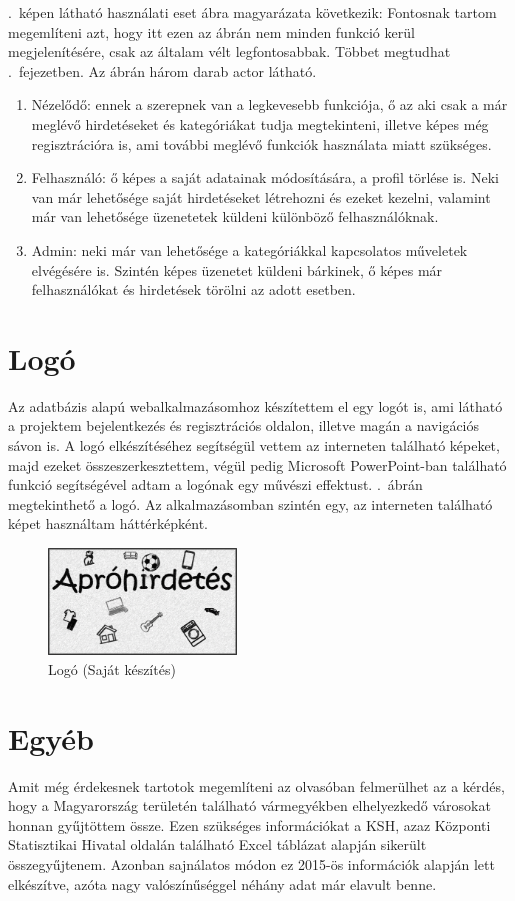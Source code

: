 \documentclass[]{thesis-ekf}
\theoremstyle{definition}
\theoremstyle{remark}
\begin{document}
	.~képen látható használati eset ábra magyarázata következik:
	Fontosnak tartom megemlíteni azt, hogy itt ezen az ábrán nem minden funkció kerül megjelenítésére, csak az általam vélt  legfontosabbak. Többet megtudhat .~fejezetben. Az ábrán három darab actor látható.
	\begin{enumerate}
		\item Nézelődő: ennek a szerepnek van a legkevesebb funkciója, ő az aki csak a már meglévő hirdetéseket és kategóriákat tudja megtekinteni, illetve képes még regisztrációra is, ami további meglévő funkciók használata miatt szükséges.
		\item Felhasználó: ő képes a saját adatainak módosítására, a profil törlése is. Neki van már lehetősége saját hirdetéseket létrehozni és ezeket kezelni, valamint már van lehetősége üzenetetek küldeni különböző felhasználóknak.
		\item Admin: neki már van lehetősége a kategóriákkal kapcsolatos műveletek elvégésére is. Szintén képes üzenetet küldeni bárkinek, ő képes már felhasználókat és hirdetések törölni az adott esetben.
	\end{enumerate}
	\section{Logó}
		Az adatbázis alapú webalkalmazásomhoz készítettem el egy logót is, ami látható a projektem bejelentkezés és regisztrációs oldalon, illetve magán a navigációs sávon is. A logó elkészítéséhez segítségül vettem az interneten található képeket, majd ezeket összeszerkesztettem, végül pedig Microsoft PowerPoint-ban található funkció segítségével adtam a logónak egy művészi effektust. .~ábrán megtekinthető a logó. Az alkalmazásomban szintén egy, az interneten található képet használtam háttérképként. \cite{Hatterkep, Logo}
		\begin{figure}[ht!]
			\centering
			\includegraphics[width=5cm]{./tervezes/logo}
			\caption{Logó (Saját készítés)} 
			\label{logo}
		\end{figure}
	
	\section{Egyéb}
		Amit még érdekesnek tartotok megemlíteni az olvasóban felmerülhet az a kérdés, hogy a Magyarország területén található vármegyékben elhelyezkedő városokat honnan gyűjtöttem össze. Ezen szükséges információkat a KSH, azaz Központi Statisztikai Hivatal oldalán található Excel táblázat alapján sikerült összegyűjtenem. Azonban sajnálatos módon ez 2015-ös információk alapján lett elkészítve, azóta nagy valószínűséggel néhány adat már elavult benne. \cite{KSH}
\end{document}
